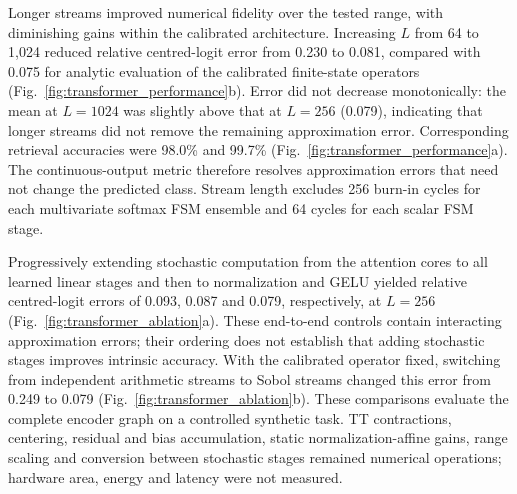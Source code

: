 Longer streams improved numerical fidelity over the tested range, with
diminishing gains within the calibrated architecture.
Increasing $L$ from 64 to 1,024 reduced relative centred-logit error from
0.230 to 0.081, compared with 0.075 for analytic
evaluation of the calibrated finite-state operators
(Fig.~\ref{fig:transformer_performance}b). Error did not decrease monotonically:
the mean at $L=1024$ was slightly above that at $L=256$ (0.079),
indicating that longer streams did not remove the remaining approximation
error. Corresponding retrieval
accuracies were 98.0\% and 99.7\%
(Fig.~\ref{fig:transformer_performance}a). The continuous-output metric
therefore resolves approximation errors that need not change the predicted
class. Stream length excludes 256 burn-in cycles for each multivariate
softmax FSM ensemble and 64 cycles for each scalar FSM stage.

Progressively extending stochastic computation from the attention cores to
all learned linear stages and then to normalization and GELU yielded relative
centred-logit errors of 0.093, 0.087 and 0.079, respectively,
at $L=256$ (Fig.~\ref{fig:transformer_ablation}a). These end-to-end controls
contain interacting approximation errors; their ordering does not establish
that adding stochastic stages improves intrinsic accuracy. With the calibrated
operator fixed, switching from independent arithmetic streams to Sobol
streams changed this error from 0.249 to 0.079
(Fig.~\ref{fig:transformer_ablation}b). These comparisons evaluate the
complete encoder graph on a controlled synthetic task. TT contractions,
centering, residual and bias accumulation, static normalization-affine gains,
range scaling and conversion between stochastic stages remained numerical
operations; hardware area, energy and latency were not measured.
